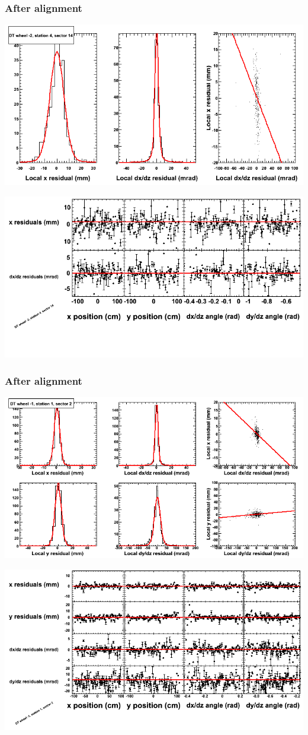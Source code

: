 \documentclass[compress]{beamer}
\begin{document}
\begin{frame}
\frametitle{After alignment}
\includegraphics[width=0.7\linewidth]{NOV4_fitfunctions/MBwhAst4sec14_bellcurves.png}

\includegraphics[width=0.7\linewidth]{NOV4_fitfunctions/MBwhAst4sec14_polynomials.png}
\end{frame}

\begin{frame}
\frametitle{After alignment}
\includegraphics[width=0.7\linewidth]{NOV4_fitfunctions/MBwhBst1sec02_bellcurves.png}

\includegraphics[width=0.7\linewidth]{NOV4_fitfunctions/MBwhBst1sec02_polynomials.png}
\end{frame}
\end{document}

